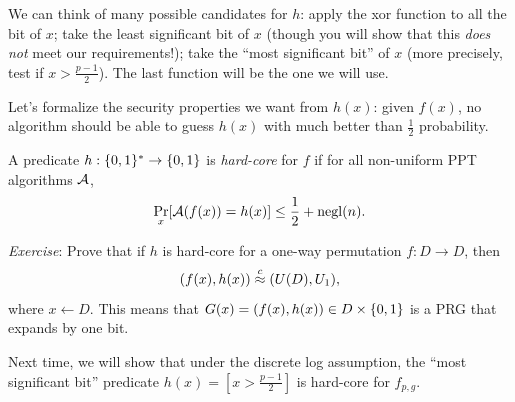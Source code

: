\documentclass[11pt]{article}
\begin{document}
We can think of many possible candidates for $h$: apply the xor
function to all the bit of $x$; take the least significant bit of $x$
(though you will show that this \emph{does not} meet our
requirements!); take the ``most significant bit'' of $x$ (more
precisely, test if $x>\frac{p-1}{2}$).  The last function will be the
one we will use.

Let's formalize the security properties we want from $h(x)$: given
$f(x)$, no algorithm should be able to guess $h(x)$ with much better
than $\frac{1}{2}$ probability.

\begin{definition}
  \label{def:hard-core-pred}
  A predicate $h: \{0,1\}^* \to \{0,1\}$ is \emph{hard-core} for $f$ if for
  all non-uniform PPT algorithms $\mathcal{A}$,
  \[ \Pr_{x}[\mathcal{A}(f(x))=h(x)] \leq \frac{1}{2} + \operatorname{negl}(n). \]
\end{definition}

\emph{Exercise}: Prove that if $h$ is hard-core for a one-way
permutation $f:D \to D$, then \[ (f(x),h(x)) \stackrel{c}{\approx} (U(D),U_1), \]
where $x \gets D$.  This means that $G(x)=(f(x),h(x)) \in D \times
\{0,1\}$ is a PRG that expands by one bit.

Next time, we will show that under the discrete log assumption, the
``most significant bit'' predicate $h(x) = [x > \frac{p-1}{2}]$ is
hard-core for $f_{p,g}$.
\end{document}
